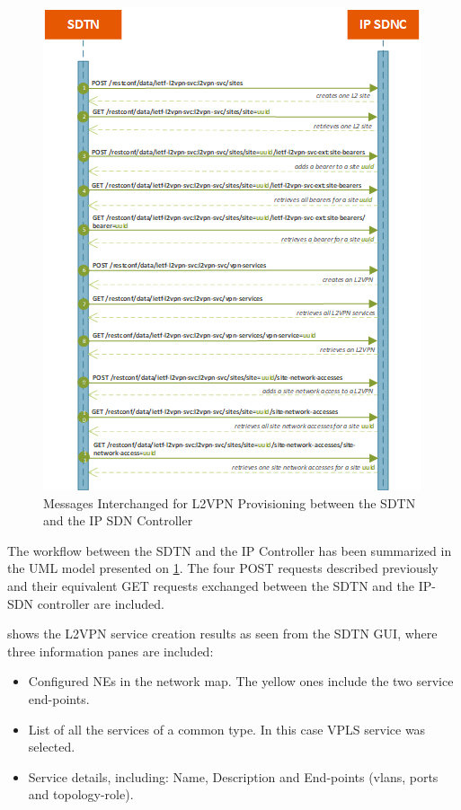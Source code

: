 \documentclass[a4paper,fleqn]{cas-dc}
\begin{document}
\begin{figure}
	\centering
		\includegraphics[width=\linewidth]{figs/l2sm_workflow_2.png}
	\caption{Messages Interchanged for L2VPN Provisioning between the SDTN and the IP SDN Controller}
	\label{FIG:L2SM_workflow}
\end{figure}

The workflow between the SDTN and the IP Controller has been summarized in the UML model presented on \cref{FIG:L2SM_workflow}. The four POST requests described previously and their equivalent GET requests exchanged between the SDTN and the IP-SDN controller are included. 

 shows the L2VPN service creation results as seen from the SDTN GUI, where three information panes are included: 
\begin{itemize}
    \item Configured NEs in the network map. The yellow ones include the two service end-points.
    \item List of all the services of a common type. In this case VPLS service was selected. 
    \item Service details, including: Name, Description and End-points (vlans, ports and topology-role). 
\end{itemize}
\end{document}
